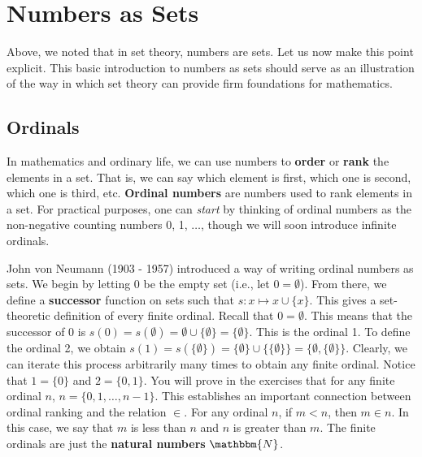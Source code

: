 \documentclass[11pt]{article}
\theoremstyle{definition}
\theoremstyle{remark}
\begin{document}
\section{Numbers as Sets}
Above, we noted that in set theory, numbers are sets. Let us now make this point explicit. This basic introduction to numbers as sets should serve as an illustration of the way in which set theory can provide firm foundations for mathematics.

\subsection{Ordinals}
In mathematics and ordinary life, we can use numbers to \textbf{order} or \textbf{rank} the elements in a set. That is, we can say which element is first, which one is second, which one is third, etc. \textbf{Ordinal numbers} are numbers used to rank elements in a set. For practical purposes, one can \textit{start} by thinking of ordinal numbers as the non-negative counting numbers 0, 1, $\dots$, though we will soon introduce infinite ordinals.\par

John von Neumann (1903 - 1957) introduced a way of writing ordinal numbers as sets. We begin by letting 0 be the empty set (i.e., let $0=\emptyset$). From there, we define a \textbf{successor} function on sets such that $s:x\mapsto x\cup\{x\}$. This gives a set-theoretic definition of every finite ordinal. Recall that $0=\emptyset$. This means that the successor of 0 is $s(0)=s(\emptyset)=\emptyset\cup\{\emptyset\}=\{\emptyset\}$. This is the ordinal 1. To define the ordinal 2, we obtain $s(1)=s(\{\emptyset\})=\{\emptyset\}\cup\{\{\emptyset\}\}=\{\emptyset,\{\emptyset\}\}$. Clearly, we can iterate this process arbitrarily many times to obtain any finite ordinal. Notice that $1=\{0\}$ and $2=\{0,1\}$. You will prove in the exercises that for any finite ordinal $n$, $n=\{0,1,\dots,n-1\}$. This establishes an important connection between ordinal ranking and the relation $\in$. For any ordinal $n$, if $m<n$, then $m\in n$. In this case, we say that $m$ is less than $n$ and $n$ is greater than $m$. The finite ordinals are just the \textbf{natural numbers} $\mathbbm{N}$.\par
\end{document}
